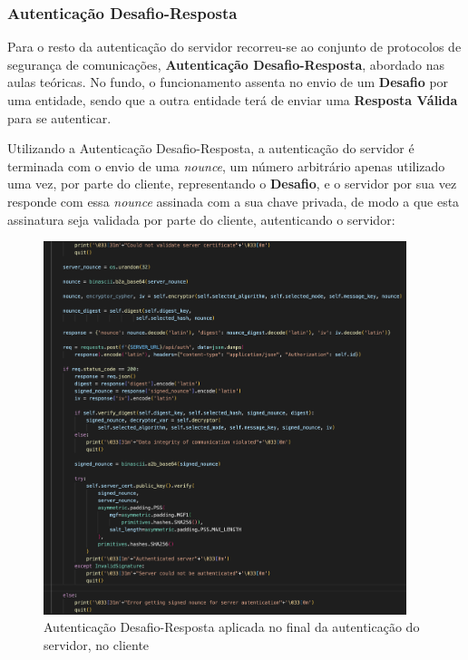 \documentclass[10pt,english]{article}
\begin{document}
\clearpage

\subsubsection{Autenticação Desafio-Resposta}

\par Para o resto da autenticação do servidor recorreu-se ao conjunto de protocolos de segurança de comunicações, \textbf{Autenticação Desafio-Resposta}, abordado nas aulas teóricas. No fundo, o funcionamento assenta no envio de um \textbf{Desafio} por uma entidade, sendo que a outra entidade terá de enviar uma \textbf{Resposta Válida} para se autenticar.

\par Utilizando a Autenticação Desafio-Resposta, a autenticação do servidor é terminada com o envio de uma \textit{nounce}, um número arbitrário apenas utilizado uma vez, por parte do cliente, representando o \textbf{Desafio}, e o servidor por sua vez responde com essa \textit{nounce} assinada com a sua chave privada, de modo a que esta assinatura seja validada por parte do cliente, autenticando o servidor:

\begin{figure}[!h]
        \centering
        \includegraphics[width=400]{images/server_auth_2_client.png}
        \caption{Autenticação Desafio-Resposta aplicada no final da autenticação do servidor, no cliente}
\end{figure}
\end{document}
